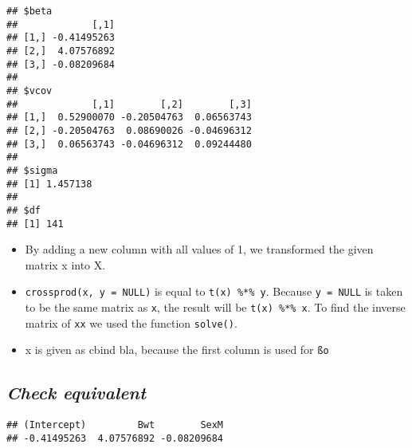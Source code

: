 \documentclass[12,]{article}
\newenvironment{Shaded}{\begin{snugshade}}{\end{snugshade}}
\newcommand{\KeywordTok}[1]{\textcolor[rgb]{0.13,0.29,0.53}{\textbf{#1}}}
\newcommand{\DataTypeTok}[1]{\textcolor[rgb]{0.13,0.29,0.53}{#1}}
\newcommand{\DecValTok}[1]{\textcolor[rgb]{0.00,0.00,0.81}{#1}}
\newcommand{\StringTok}[1]{\textcolor[rgb]{0.31,0.60,0.02}{#1}}
\newcommand{\OperatorTok}[1]{\textcolor[rgb]{0.81,0.36,0.00}{\textbf{#1}}}
\newcommand{\NormalTok}[1]{#1}
\providecommand{\tightlist}{%
  \setlength{\itemsep}{0pt}\setlength{\parskip}{0pt}}
\begin{document}
\begin{verbatim}
## $beta
##             [,1]
## [1,] -0.41495263
## [2,]  4.07576892
## [3,] -0.08209684
## 
## $vcov
##             [,1]        [,2]        [,3]
## [1,]  0.52900070 -0.20504763  0.06563743
## [2,] -0.20504763  0.08690026 -0.04696312
## [3,]  0.06563743 -0.04696312  0.09244480
## 
## $sigma
## [1] 1.457138
## 
## $df
## [1] 141
\end{verbatim}

\begin{itemize}
\tightlist
\item
  By adding a new column with all values of 1, we transformed the given
  matrix x into X.\\
\item
  \texttt{crossprod(x,\ y\ =\ NULL)} is equal to
  \texttt{t(x)\ \%*\%\ y}. Because \texttt{y\ =\ NULL} is taken to be
  the same matrix as \texttt{x}, the result will be
  \texttt{t(x)\ \%*\%\ x}. To find the inverse matrix of
  \texttt{x\textquotesingle{}x} we used the function \texttt{solve()}.\\
\item
  x is given as cbind bla, because the first column is used for
  \texttt{ßo}
\end{itemize}

\subsection{\texorpdfstring{\emph{Check
equivalent}}{Check equivalent}}\label{check-equivalent}

\begin{Shaded}
\end{Shaded}

\begin{verbatim}
## (Intercept)         Bwt        SexM 
## -0.41495263  4.07576892 -0.08209684
\end{verbatim}
\end{document}
